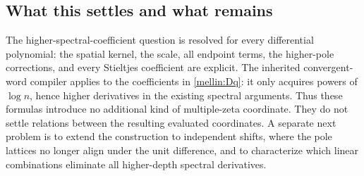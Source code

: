 \subsection{What this settles and what remains}

The higher-spectral-coefficient question is resolved for every
differential polynomial: the spatial kernel, the scale, all endpoint
terms, the higher-pole corrections, and every Stieltjes coefficient are
explicit.  The inherited convergent-word compiler applies to the
coefficients in \eqref{mellin:Dq}: it only acquires powers of
$\log n$, hence higher derivatives in the existing spectral arguments.
Thus these formulas introduce no additional kind of multiple-zeta
coordinate.  They do not settle relations between the resulting
evaluated coordinates.  A separate next problem is to extend the
construction to independent shifts, where the pole lattices no longer
align under the unit difference, and to characterize which linear
combinations eliminate all higher-depth spectral derivatives.
